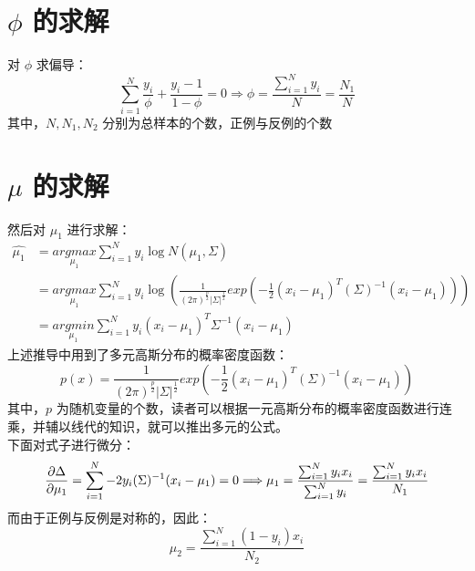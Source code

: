 \documentclass{report}
\begin{document}
\section{$\phi$ 的求解}
对 $\phi$ 求偏导：
$$
\sum_{i=1}^{N} \frac{y_{i}}{\phi}+\frac{y_{i}-1}{1-\phi}=0
\Longrightarrow \phi=\frac{\sum_{i=1}^{N} y_{i}}{N}=\frac{N_{1}}{N}
$$
其中，$N,N_1,N_2$ 分别为总样本的个数，正例与反例的个数
\section{$\mu$ 的求解}
然后对 $\mu_1$ 进行求解：
$$
\begin{aligned} \hat{\mu_{1}} 
&=\underset{\mu_{1}}{argmax} \sum_{i=1}^{N} y_{i} \log N\left(\mu_{1}, \Sigma\right) \\
&=\underset{\mu_1}{argmax} \sum_{i=1}^{N} y_i \log (\frac{1}{(2\pi)^{\frac{p}{2}}|\Sigma|^{\frac{1}{2}}}exp(-\frac{1}{2}(x_i-\mu_1)^T(\Sigma)^{-1}(x_i-\mu_1)))\\
&=\underset{\mu_{1}}{argmin} \sum_{i=1}^{N} y_{i}\left(x_{i}-\mu_{1}\right)^{T} \Sigma^{-1}\left(x_{i}-\mu_{1}\right)
\end{aligned}
$$
上述推导中用到了多元高斯分布的概率密度函数：
$$
p(x)=\frac{1}{(2\pi)^{\frac{p}{2}}|\Sigma|^{\frac{1}{2}}}exp(-\frac{1}{2}(x_i-\mu_1)^T(\Sigma)^{-1}(x_i-\mu_1))
$$
其中，$p$ 为随机变量的个数，读者可以根据一元高斯分布的概率密度函数进行连乘，并辅以线代的知识，就可以推出多元的公式。\\
下面对式子进行微分：
$$
\frac{\partial \Delta}{\partial \mu_1}=\sum_{i=1}^N -2y_i (\Sigma)^{-1}(x_i-\mu_1)=0\\
\Longrightarrow \mu_{1}=\frac{\sum_{i=1}^{N} y_{i} x_{i}}{\sum_{i=1}^{N} y_{i}}=\frac{\sum_{i=1}^{N} y_{i} x_{i}}{N_{1}}
$$
而由于正例与反例是对称的，因此：
$$
\mu_{2}=\frac{\sum_{i=1}^{N}\left(1-y_{i}\right) x_{i}}{N_{2}}
$$
\end{document}
